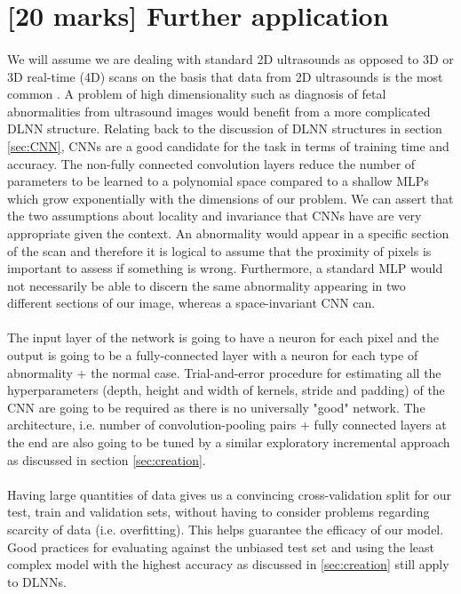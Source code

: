 \documentclass[11pt,a4paper]{article}
\begin{document}
\section{[20 marks] Further application}

\label{sec:further}

\paragraph{}
We will assume we are dealing with standard 2D ultrasounds as opposed to 3D or 3D real-time (4D) scans on the basis that data from 2D ultrasounds is the most common \autocite{doi:10.1002/uog.3933}.
A problem of high dimensionality such as diagnosis of fetal abnormalities from ultrasound images would benefit from a more complicated DLNN structure.
Relating back to the discussion of DLNN structures in section \ref{sec:CNN}, CNNs are a good candidate for the task in terms of training time and accuracy. The non-fully connected convolution layers reduce the number of parameters to be learned to a polynomial space compared to a shallow MLPs which grow exponentially with the dimensions of our problem. We can assert that the two assumptions about locality and invariance that CNNs have are very appropriate given the context. An abnormality would appear in a specific section of the scan and therefore it is logical to assume that the proximity of pixels is important to assess if something is wrong. Furthermore, a standard MLP would not necessarily be able to discern the same abnormality appearing in two different sections of our image, whereas a space-invariant CNN can.

\paragraph{}
The input layer of the network is going to have a neuron for each pixel and the output is going to be a fully-connected layer with a neuron for each type of abnormality + the normal case. Trial-and-error procedure for estimating all the hyperparameters (depth, height and width of kernels, stride and padding) of the CNN are going to be required as there is no universally "good" network. The architecture, i.e. number of convolution-pooling pairs + fully connected layers at the end are also going to be tuned by a similar exploratory incremental approach as discussed in section \ref{sec:creation}.

\paragraph{}
Having large quantities of data gives us a convincing cross-validation split for our test, train and validation sets, without having to consider problems regarding scarcity of data (i.e. overfitting). This helps guarantee the efficacy of our model. Good practices for evaluating against the unbiased test set and using the least complex model with the highest accuracy as discussed in \ref{sec:creation} still apply to DLNNs.
\end{document}
